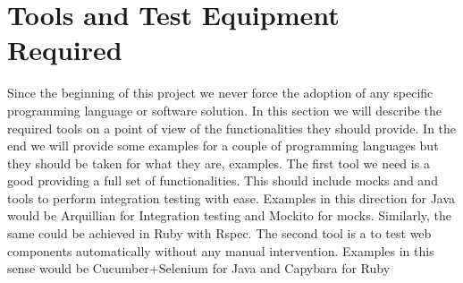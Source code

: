 \pagebreak
\section{Tools and Test Equipment Required}
Since the beginning of this project we never force the adoption of any specific
programming language or software solution. In this section we will describe the
required tools on a point of view of the functionalities they should provide.
In the end we will provide some examples for a couple of programming languages
but they should be taken for what they are, examples.
The first tool we need is a good 
providing a full set of functionalities. This should include mocks and
and tools to perform integration testing with ease.
Examples in this direction for Java would be Arquillian for Integration testing
and Mockito for mocks.
Similarly, the same could be achieved in Ruby with Rspec.
The second tool is a  to test web components automatically
without any manual intervention.
Examples in this sense would be Cucumber+Selenium for Java and Capybara for Ruby

